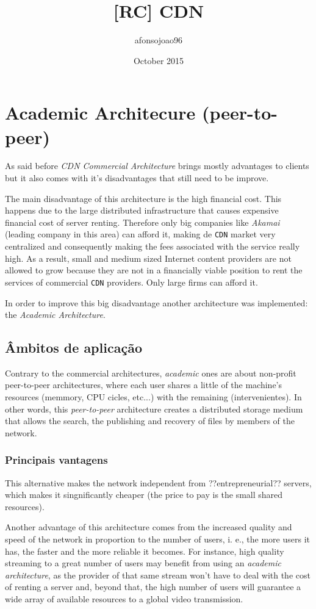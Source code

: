 \documentclass{article}
\title{[RC] CDN}
\author{afonsojoao96 }
\date{October 2015}
\begin{document}
\section{Academic Architecure (peer-to-peer)}
As said before \emph{CDN Commercial Architecture} brings mostly advantages to
clients but it also comes with it's disadvantages that still
need to be improve. 

The main disadvantage of this architecture is the high financial cost. This
happens due to the large distributed infrastructure that causes expensive
financial cost of server renting. Therefore only big companies like \emph{Akamai}
(leading company in this area) can afford it, making de \texttt{CDN} market very
centralized and consequently making the fees associated with the service
really high. As a result, small and medium sized Internet content providers
are not allowed to grow because they are not in a financially viable position
to rent the services of commercial \texttt{CDN} providers. Only large firms can
afford it.


In order to improve this big disadvantage another architecture was implemented:
the \emph{Academic Architecture}.

\subsection{Âmbitos de aplicação}

Contrary to the commercial architectures, \emph{academic} ones are about
non-profit peer-to-peer architectures, where each user shares a  little of the
machine's resources (memmory, CPU cicles, etc...) with the remaining
(intervenientes). In other words, this \emph{peer-to-peer} architecture
creates a distributed storage medium that allows the search, the publishing
and recovery of files by members of the network.

\subsubsection{Principais vantagens}

This alternative makes the network independent from ??entrepreneurial?? servers,
which makes it singnificantly cheaper (the price to pay is the small shared resources).

Another advantage of this architecture comes from the increased quality and speed
of the network in proportion to the number of users, i. e., the more users it has,
the faster and the more reliable it becomes. 
For instance, high quality streaming to a great number of users may benefit from
using an \emph{academic architecture}, as the provider of that same stream won't
have to deal with the cost of renting a server and, beyond that, the high number
of users will guarantee a wide array of available resources to a global video
transmission.  
\end{document}
